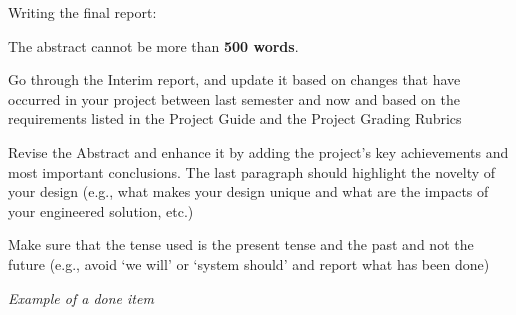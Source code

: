 \documentclass[../main.tex]{subfiles}
\begin{document}
\vfill
\begin{newrequirements}
    Writing the final report:
    \begin{todolist}
        \item[\done] The abstract cannot be more than \textbf{500 words}.
        \item Go through the Interim report, 
            and update it based on changes that have occurred 
            in your project between last semester and now
            and based on the requirements listed in the 
            Project Guide and the Project Grading Rubrics
        \item Revise the Abstract and enhance it by adding 
            the project’s key achievements and most important 
            conclusions. 
            The last paragraph should highlight the novelty 
            of your design (e.g., what makes your design 
            unique and what are the impacts of your 
            engineered solution, etc.)
        \item Make sure that the tense used is the present 
            tense and the past and not the future 
            (e.g., avoid ‘we will’ or ‘system should’ 
            and report what has been done) 
        \item[\done] \textit{Example of a done item}
    \end{todolist}
\end{newrequirements}
\vspace{0.5cm}
\end{document}
